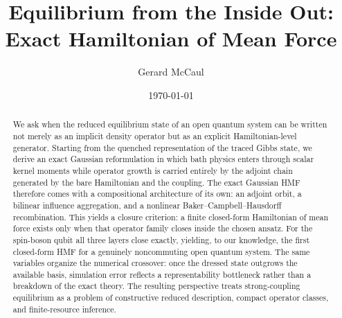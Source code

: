 \documentclass[aps,prl,twocolumn,superscriptaddress,showpacs,floatfix]{revtex4-2}
\begin{document}
\title{Equilibrium from the Inside Out: Exact Hamiltonian of Mean Force}
\author{Gerard McCaul}
\date{\today}

\begin{abstract}
We ask when the reduced equilibrium state of an open quantum system can be
written not merely as an implicit density operator but as an explicit
Hamiltonian-level generator. Starting from the quenched representation of the
traced Gibbs state, we derive an exact Gaussian reformulation in which bath
physics enters through scalar kernel moments while operator growth is carried
entirely by the adjoint chain generated by the bare Hamiltonian and the
coupling. The exact Gaussian HMF therefore comes with a compositional
architecture of its own: an adjoint orbit, a bilinear influence aggregation,
and a nonlinear Baker--Campbell--Hausdorff recombination. This yields a
closure criterion: a finite closed-form Hamiltonian of mean force exists only
when that operator family closes inside the chosen ansatz. For the spin-boson
qubit all three layers close exactly, yielding, to our knowledge, the first
closed-form HMF for a genuinely noncommuting open quantum system. The same
variables organize the numerical crossover: once the dressed state outgrows
the available basis, simulation error reflects a representability bottleneck
rather than a breakdown of the exact theory. The resulting perspective treats
strong-coupling equilibrium as a problem of constructive reduced description,
compact operator classes, and finite-resource inference.
\end{abstract}

\maketitle













\appendix
\setcounter{secnumdepth}{2}





\end{document}
